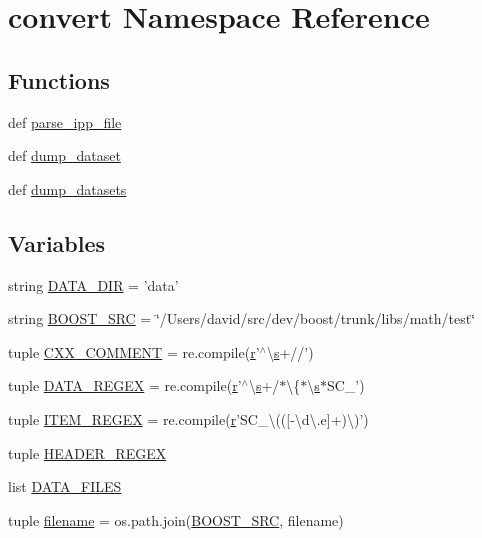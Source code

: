 \hypertarget{namespaceconvert}{}\section{convert Namespace Reference}
\label{namespaceconvert}
\subsection*{Functions}
\begin{DoxyCompactItemize}
\item 
def \hyperlink{namespaceconvert_a3b6d9203019db8d53988a3818b36d492}{parse\+\_\+ipp\+\_\+file}
\item 
def \hyperlink{namespaceconvert_a9cbd7e5a0cdd315cead4ce4f261529e4}{dump\+\_\+dataset}
\item 
def \hyperlink{namespaceconvert_a2a55fbeeec5bd6515071cbe3f1d39577}{dump\+\_\+datasets}
\end{DoxyCompactItemize}
\subsection*{Variables}
\begin{DoxyCompactItemize}
\item 
string \hyperlink{namespaceconvert_a8fbcbafaf218ed4308c911ad18deb377}{D\+A\+T\+A\+\_\+\+D\+I\+R} = 'data'
\item 
string \hyperlink{namespaceconvert_a74027563264b979c98d0913f5b6e4df7}{B\+O\+O\+S\+T\+\_\+\+S\+R\+C} = \char`\"{}/Users/david/src/dev/boost/trunk/libs/math/test\char`\"{}
\item 
tuple \hyperlink{namespaceconvert_a874bcd91a82f541d257048a6b471cd42}{C\+X\+X\+\_\+\+C\+O\+M\+M\+E\+N\+T} = re.\+compile(\hyperlink{indexexpr_8h_ac434fd11cc2493608d8d91424d60c17e}{r}'$^\wedge$\textbackslash{}\hyperlink{indexexpr_8h_ae024b0db549122b44c349ae28ec990dc}{s}+//')
\item 
tuple \hyperlink{namespaceconvert_a8aaa34723091aba26dfa8133793e99f7}{D\+A\+T\+A\+\_\+\+R\+E\+G\+E\+X} = re.\+compile(\hyperlink{indexexpr_8h_ac434fd11cc2493608d8d91424d60c17e}{r}'$^\wedge$\textbackslash{}\hyperlink{indexexpr_8h_ae024b0db549122b44c349ae28ec990dc}{s}+/$\ast$\textbackslash{}\{$\ast$\textbackslash{}\hyperlink{indexexpr_8h_ae024b0db549122b44c349ae28ec990dc}{s}$\ast$S\+C\+\_\+')
\item 
tuple \hyperlink{namespaceconvert_a17f357cf3ab914987d440b880a13d313}{I\+T\+E\+M\+\_\+\+R\+E\+G\+E\+X} = re.\+compile(\hyperlink{indexexpr_8h_ac434fd11cc2493608d8d91424d60c17e}{r}'S\+C\+\_\+\textbackslash{}((\mbox{[}-\/\textbackslash{}d\textbackslash{}.\+e\mbox{]}+)\textbackslash{})')
\item 
tuple \hyperlink{namespaceconvert_a119b9566289fde80d07af96315aa4443}{H\+E\+A\+D\+E\+R\+\_\+\+R\+E\+G\+E\+X}
\item 
list \hyperlink{namespaceconvert_aa34566905942b5b020a4ed8fdfe88663}{D\+A\+T\+A\+\_\+\+F\+I\+L\+E\+S}
\item 
tuple \hyperlink{namespaceconvert_a348778f5084675a813a98d6539c871d1}{filename} = os.\+path.\+join(\hyperlink{namespaceconvert_a74027563264b979c98d0913f5b6e4df7}{B\+O\+O\+S\+T\+\_\+\+S\+R\+C}, filename)
\end{DoxyCompactItemize}


